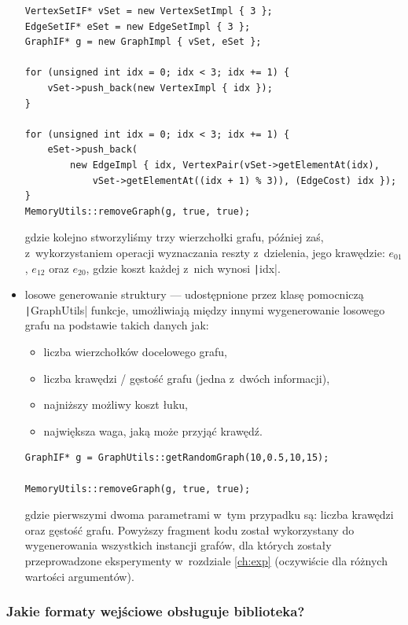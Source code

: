 \begin{itemize}
	\begin{verbatim}
VertexSetIF* vSet = new VertexSetImpl { 3 };
EdgeSetIF* eSet = new EdgeSetImpl { 3 };
GraphIF* g = new GraphImpl { vSet, eSet };

for (unsigned int idx = 0; idx < 3; idx += 1) {
	vSet->push_back(new VertexImpl { idx });
}

for (unsigned int idx = 0; idx < 3; idx += 1) {
	eSet->push_back(
		new EdgeImpl { idx, VertexPair(vSet->getElementAt(idx),
			vSet->getElementAt((idx + 1) % 3)), (EdgeCost) idx });
}
MemoryUtils::removeGraph(g, true, true);
	\end{verbatim}
	gdzie kolejno stworzyliśmy trzy wierzchołki grafu, później zaś, z~wykorzystaniem operacji wyznaczania reszty z~dzielenia,  jego krawędzie: $e_{01}$, $e_{12}$ oraz $e_{20}$, gdzie koszt każdej z~nich wynosi \texttt|idx|.\\
	
	\item losowe generowanie struktury --- udostępnione przez klasę pomocniczą \texttt|GraphUtils| funkcje, umożliwiają między innymi wygenerowanie losowego grafu na podstawie takich danych jak:
	\begin{itemize}
		\item liczba wierzchołków docelowego grafu,
		\item liczba krawędzi / gęstość grafu (jedna z~dwóch informacji),
		\item najniższy możliwy koszt łuku,
		\item największa waga, jaką może przyjąć krawędź.
	\end{itemize}

	\begin{verbatim}
GraphIF* g = GraphUtils::getRandomGraph(10,0.5,10,15);

MemoryUtils::removeGraph(g, true, true);
	\end{verbatim}
	gdzie pierwszymi dwoma parametrami w~tym przypadku są: liczba krawędzi oraz gęstość grafu. Powyższy fragment kodu został wykorzystany do wygenerowania wszystkich instancji grafów, dla których zostały przeprowadzone eksperymenty w~rozdziale \ref{ch:exp} (oczywiście dla różnych wartości argumentów).	
\end{itemize}

\subsubsection{Jakie formaty wejściowe obsługuje biblioteka?}

